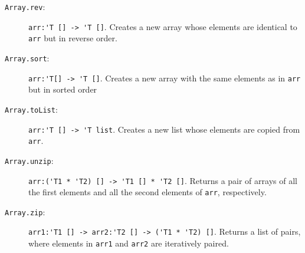 \begin{description}
\item[\texttt{Array.rev}:] \lstinline{arr:'T [] -> 'T []}. Creates a new array whose elements are identical to \lstinline{arr} but in reverse order.
\item[\texttt{Array.sort}:] \lstinline{arr:'T[] -> 'T []}. Creates a new array with the same elements as in \lstinline{arr} but in sorted order %
\item[\texttt{Array.toList}:] \lstinline{arr:'T [] -> 'T list}. Creates a new list whose elements are copied from \lstinline{arr}.
\item[\texttt{Array.unzip}:] \lstinline{arr:('T1 * 'T2) [] -> 'T1 [] * 'T2 []}. Returns a pair of arrays of all the first elements and all the second elements of \lstinline{arr}, respectively.
\item[\texttt{Array.zip}:] \lstinline{arr1:'T1 [] -> arr2:'T2 [] -> ('T1 * 'T2) []}. Returns a list of pairs, where elements in \lstinline{arr1} and \lstinline{arr2} are iteratively paired.
\end{description}

